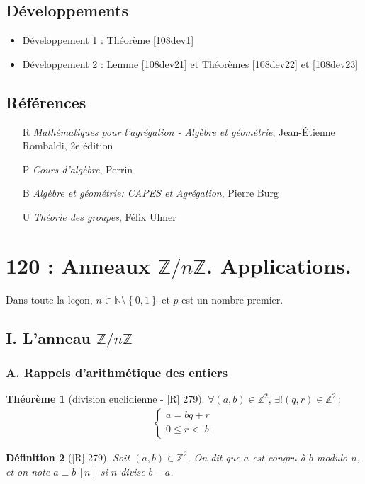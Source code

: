 \documentclass[10pt, a4paper, parskip=full, twoside, twocolumn]{report}
\newtheorem{definition}{Définition}
\newtheorem{theorem}[definition]{Théorème}
\newcommand{\IN}{\mathbb{N}}
\newcommand{\IZ}{\mathbb{Z}}
\newcommand{\IZnZ}{\mathbb{Z}/n\mathbb{Z}}
\begin{document}
\section*{Développements}
\begin{itemize}
	\item Développement 1 : Théorème \ref{108dev1}
	\item Développement 2 : Lemme \ref{108dev21} et Théorèmes \ref{108dev22} et \ref{108dev23}
\end{itemize}

\section*{Références}
\begin{itemize}
	\item[R] \emph{Mathématiques pour l'agrégation - Algèbre et géométrie}, Jean-Étienne Rombaldi, 2e édition
	\item[P] \emph{Cours d'algèbre}, Perrin
	\item[B] \emph{Algèbre et géométrie: CAPES et Agrégation}, Pierre Burg
	\item[U] \emph{Théorie des groupes}, Félix Ulmer
\end{itemize}


\chapter*{120 : Anneaux $\IZnZ$. Applications.}
Dans toute la leçon, $n\in\IN\setminus\left\{0,1\right\}$ et $p$ est un nombre premier.
\setcounter{definition}{0}
\section*{I. L'anneau $\IZnZ$}
\subsection*{A. Rappels d'arithmétique des entiers}
\begin{theorem}[division euclidienne - \textnormal{[R] 279}]
	$\forall (a,b)\in\IZ^2,\,\exists ! (q,r)\in\IZ^2 \,\colon$
	\begin{align*}
		\begin{cases}
			a=bq+r \\
			0\leq r< |b|
		\end{cases}
	\end{align*}
\end{theorem}

\begin{definition}[\textnormal{[R] 279}]
	Soit $(a,b)\in\IZ^2$. On dit que $a$ est \emph{congru à} $b$ modulo $n$,
	et on note $a\equiv b \, [n]$ si $n$ divise $b-a$.
\end{definition}
\end{document}
